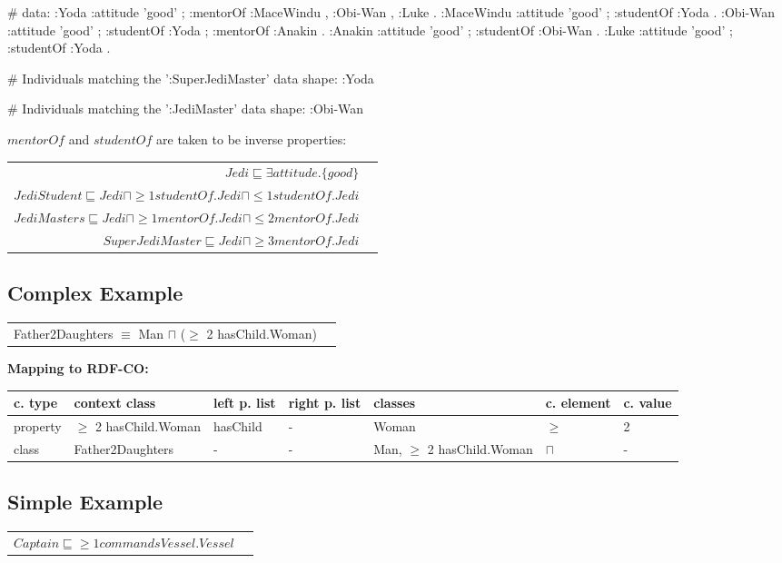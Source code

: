 \documentclass{llncs}
\newenvironment{gcotable}{
  \scriptsize
  \sffamily
  \vspace{0cm}
	\begin{center}
	\textbf{\vspace{0.4cm}Mapping to RDF-CO:} \\
  \begin{tabular}{l|l|l|l|l|l|l}
	\hline
  \textbf{c. type} & \textbf{context class} & \textbf{left p. list} & \textbf{right p. list} & \textbf{classes} & \textbf{c. element} & \textbf{c. value} \\
  \hline

}{
  \hline
  \end{tabular}
	\end{center}
}
\newenvironment{DL}{
  \vspace{0cm}
	\begin{center}
  \begin{tabular}{r l}

}{
  \end{tabular}
	\end{center}
}
\begin{document}
\begin{ex}
# data:
:Yoda 
    :attitude 'good' ;
    :mentorOf :MaceWindu , :Obi-Wan , :Luke .
:MaceWindu
    :attitude 'good' ;
    :studentOf :Yoda .
:Obi-Wan 
    :attitude 'good' ;
    :studentOf :Yoda ;
    :mentorOf :Anakin .
:Anakin
    :attitude 'good' ; 
    :studentOf :Obi-Wan .
:Luke
    :attitude 'good' ;
    :studentOf :Yoda .
\end{ex}

\begin{ex}
# Individuals matching the ’:SuperJediMaster’ data shape:
:Yoda 

# Individuals matching the ’:JediMaster’ data shape:
:Obi-Wan
\end{ex}

\noindent $mentorOf$ and $studentOf$ are taken to be inverse properties:\\

\begin{DL}
$Jedi \sqsubseteq \exists attitude.\{good\} $\\
$JediStudent \sqsubseteq Jedi \sqcap \geq1 studentOf.Jedi \sqcap \leq1 studentOf.Jedi$ \\
$JediMasters \sqsubseteq Jedi \sqcap \geq1 mentorOf.Jedi \sqcap \leq2 mentorOf.Jedi $\\
$SuperJediMaster \sqsubseteq Jedi \sqcap  \geq3 mentorOf.Jedi $
\end{DL}

\subsection{Complex Example}

\begin{DL}
Father2Daughters $\equiv$ Man $\sqcap$ ($\geq$ 2 hasChild.Woman)
\end{DL}

\begin{gcotable}
property & $\geq$ 2 hasChild.Woman & hasChild & - & Woman & $\geq$ & 2 \\
class & Father2Daughters & - & - & Man, $\geq$ 2 hasChild.Woman & $\sqcap$ & - \\
\end{gcotable}

\subsection{Simple Example}

\begin{DL}
$Captain \sqsubseteq \geq1 commandsVessel . Vessel $
\end{DL}
\end{document}
